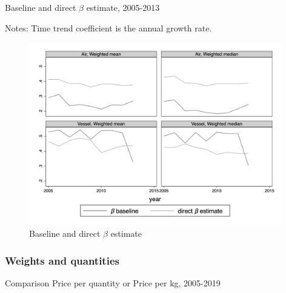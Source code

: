 \documentclass[11pt,twoside, authoryear]{elsarticle}
\begin{document}
\begin{table}[htbp]
	\caption{Baseline and direct $\beta$ estimate, 2005-2013}
	\begin{center}		
		
	
{\parbox[l]{12cm}{ \vspace{4pt}\footnotesize{Notes: Time trend coefficient is the annual growth rate.}}}
\end{center}
	\label{tab_comp_referee1_baseline}%
\end{table}%

\begin{figure}[htbp]
	\caption{Baseline and direct $\beta$ estimate }
	\begin{center}
		\includegraphics[height=8cm]
		{../scatter_chronology_baseline_referee1.png}
	\end{center}
\end{figure}


\subsubsection{Weights and quantities}


\begin{table}[htbp]
	\caption{Comparison Price per quantity or Price per kg, 2005-2019}
	\begin{center}		
		
	\end{center}
	\label{tab_comp_referee1_baseline}%
\end{table}%
\end{document}
